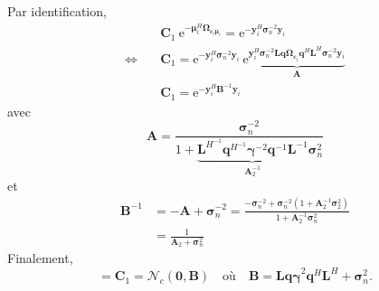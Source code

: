 \documentclass[ 12pt]{article}
\newcommand{\e}{\mathrm{e}}
\begin{document}
Par identification, 
\begin{align*}
	    & \bm{C}_1\ \e^{-\bm{\mu}_i^H   \bm{\Omega}_{\bm{c}_i \bm{\mu}_i   }} = \e^{-\bm{y}_i^H \bm{\sigma}_n^{-2} \bm{y}_i}\\
	    \Leftrightarrow \quad & \bm{C}_1 = \e^{-\bm{y}_i^H\bm{\sigma}_n^{-2}\bm{y}_i} \ \e\underbrace{^{\bm{y}_i^H \bm{\sigma}_n^{-2} \bm{Lq \Omega}_{\bm{c}_i} \bm{q}^H \bm{L}^H  \bm{\sigma}_n^{-2}\bm{y}_i}}_{\bm{A}}\\
	    & \bm{C}_1 = \e^{-\bm{y}_i ^H \bm{B}^{-1} \bm{y}_i}
\end{align*}
avec 
\begin{equation*}
	    \bm{A} = \frac{\bm{\sigma}_n^{-2}}{1 + \underbrace{\bm{L}^{H^{-1}} \bm{q}^{H^{-1}} \bm{\gamma}^{-2} \bm{q}^{-1}\bm{L}^{-1} }_{\bm{A}_2^{-1}} \bm{\sigma}_n^{2}}
\end{equation*}
et 
\begin{align*}
	    \bm{B}^{-1} & = -\bm{A} + \bm{\sigma}_n^{-2}  = \frac{\bm{- \sigma}_n^{-2} + \bm{\sigma}_n^{-2} \left( 1+ \bm{A}_2^{-1} \bm{\sigma}_2^2\right)}{1+  \bm{A}_2^{-1}\bm{\sigma}_n^{2}}\\
	    & = \frac{1}{\bm{A}_2 + \bm{\sigma}_n^2}
\end{align*}
Finalement, 
\begin{equation*}
	      [\bm{y}_i | \infty_{-\bm{c}}]  = \bm{C}_1 = \mathcal{N}_c(\bm{0}, \bm{B}) \quad \text{où} \quad \bm{B} = \bm{Lq \gamma}^2 \bm{q}^H \bm{L}^H +\bm{\sigma}_n^2 .
\end{equation*}






 





\end{document}
